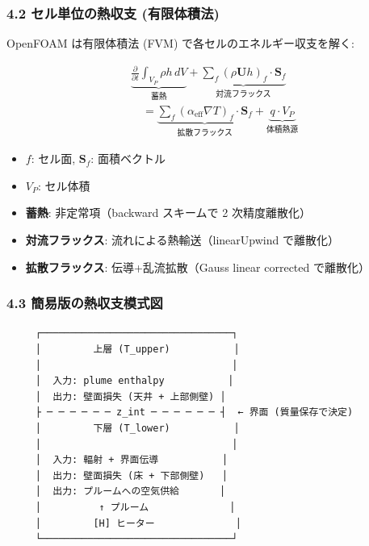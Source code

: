 \documentclass[a4paper,11pt]{article}
\begin{document}
\subsubsection{4.2 セル単位の熱収支 (有限体積法)}

OpenFOAM は有限体積法 (FVM) で各セルのエネルギー収支を解く:

\begin{align*}
&\underbrace{\frac{\partial}{\partial t} \int_{V_P} \rho h \, dV}_{\text{蓄熱}}
+ \underbrace{\sum_f (\rho \mathbf{U} h)_f \cdot \mathbf{S}_f}_{\text{対流フラックス}} \\
&\quad = \underbrace{\sum_f (\alpha_{\text{eff}} \nabla T)_f \cdot \mathbf{S}_f}_{\text{拡散フラックス}}
+ \underbrace{q \cdot V_P}_{\text{体積熱源}}
\end{align*}

\begin{itemize} \item $f$: セル面, $\mathbf{S}_f$: 面積ベクトル \end{itemize}
\begin{itemize} \item $V_P$: セル体積 \end{itemize}
\begin{itemize} \item \textbf{蓄熱}: 非定常項（backward スキームで 2 次精度離散化） \end{itemize}
\begin{itemize} \item \textbf{対流フラックス}: 流れによる熱輸送（linearUpwind で離散化） \end{itemize}
\begin{itemize} \item \textbf{拡散フラックス}: 伝導+乱流拡散（Gauss linear corrected で離散化） \end{itemize}

\subsubsection{4.3 簡易版の熱収支模式図}

\begin{verbatim}
     ┌─────────────────────────────────┐
     │         上層 (T_upper)           │
     │                                 │
     │  入力: plume enthalpy           │
     │  出力: 壁面損失 (天井 + 上部側壁) │
     ├ ─ ─ ─ ─ ─ ─ z_int ─ ─ ─ ─ ─ ─ ┤  ← 界面 (質量保存で決定)
     │         下層 (T_lower)           │
     │                                 │
     │  入力: 輻射 + 界面伝導           │
     │  出力: 壁面損失 (床 + 下部側壁)   │
     │  出力: プルームへの空気供給       │
     │          ↑ プルーム              │
     │         [H] ヒーター              │
     └─────────────────────────────────┘
\end{verbatim}
\end{document}
